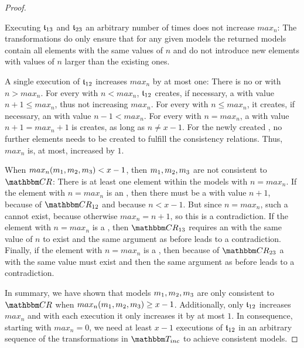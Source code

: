 \begin{proof}
    \begin{properdescription}
        \item[Executing $\mathfrak{t}_{13}$ and $\mathfrak{t}_{23}$ an arbitrary number of times does not increase $max_n$:]
        The transformations do only ensure that for any given models the returned models contain all elements with the same values of $n$ and do not introduce new elements with values of $n$ larger than the existing ones.
        \item[A single execution of $\mathfrak{t}_{12}$ increases $max_n$ by at most one:]
        There is no  or  with $n > max_n$.
        For every  with $n < max_n$, $\mathfrak{t}_{12}$ creates, if necessary, a  with value $n + 1 \leq max_n$, thus not increasing $max_n$.
        For every  with $n \leq max_n$, it creates, if necessary, an  with value $n-1 < max_n$.
        For every  with $n = max_n$, a  with value $n+1 = max_n + 1$ is creates, as long as $n \neq x-1$.
        For the newly created , no further elements needs to be created to fulfill the consistency relations.
        Thus, $max_n$ is, at most, increased by $1$.
        \item[ When $max_n(m_{1},m_{2},m_{3}) < x-1$, then $m_{1},m_{2},m_{3}$ are not consistent to $\consistencyrelationset{CR}$:]
        There is at least one element within the models with $n = max_n$.
        If the element with $n = max_n$ is an , then there must be a  with value $n+1$, because of $\consistencyrelationset{CR}_{12}$ and because $n < x-1$.
        But since $n = max_n$, such a  cannot exist, because otherwise $max_n = n+1$, so this is a contradiction.    
        If the element with $n = max_n$ is a , then $\consistencyrelationset{CR}_{13}$ requires an  with the same value of $n$ to exist and the same argument as before leads to a contradiction.
        Finally, if the element with $n = max_n$ is a , then because of $\consistencyrelationset{CR}_{23}$ a  with the same value must exist and then the same argument as before leads to a contradiction.
    \end{properdescription}

    In summary, we have shown that models $m_{1},m_{2},m_{3}$ are only consistent to $\consistencyrelationset{CR}$ when $max_n(m_{1},m_{2},m_{3}) \geq x-1$.
    Additionally, only $\mathfrak{t}_{12}$ increases $max_n$ and with each execution it only increases it by at most $1$.
    In consequence, starting with $max_n = 0$, we need at least $x-1$ executions of $\mathfrak{t}_{12}$ in an arbitrary sequence of the transformations in $\transformationset{T}_{inc}$ to achieve consistent models.
\end{proof}

